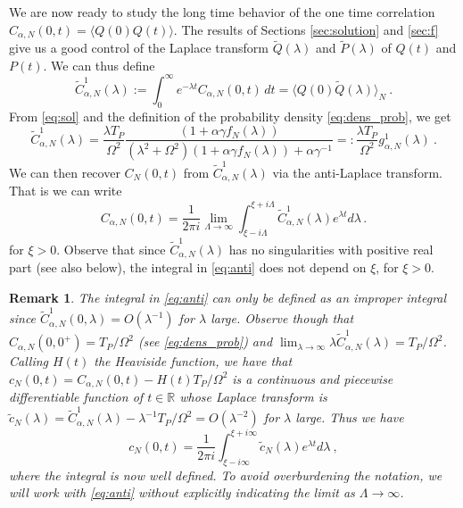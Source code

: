 \documentclass[11pt]{article}
\numberwithin{equation}{section}
\newtheorem{rmk}[theorem]{Remark}
\numberwithin{theorem}{section}
\def\tilde#1{\widetilde{#1}}
\begin{document}
We are now ready to study the long time behavior of the one time correlation $C_{\alpha,N}(0,t)=\langle
Q(0)Q(t)\rangle$. The results of Sections \ref{sec:solution} and \ref{sec:f} give us a good control of the Laplace
transform $\tilde Q(\lambda)$ and $\tilde P(\lambda)$ of $Q(t)$ and $P(t)$. We can thus define
\begin{equation}\label{eq:C1}
\tilde C^1_{\alpha,N}(\lambda) := \int_0^\infty e^{-\lambda t} C_{\alpha,N}(0,t)\,dt =
\langle Q(0)\tilde Q(\lambda)\rangle_N\ .
\end{equation}
From \eqref{eq:sol} and the definition of the probability density \eqref{eq:dens_prob}, we get
\begin{equation}\label{eq:def_g^1_N}
	\tilde C^1_{\alpha,N}(\lambda) = \frac{\lambda T_P}{\Omega^2}\frac{(1+\alpha \gamma
		f_N(\lambda))}{\left(\lambda^2+\Omega^2\right)\left(1+\alpha\gamma
		f_N(\lambda)\right) + \alpha\gamma^{-1}}=:\frac{\lambda T_P}{\Omega^2}
	g^1_{\alpha,N}(\lambda)\ .
\end{equation}
We can then recover $C_N(0,t)$ from $\tilde C^1_{\alpha,N}(\lambda)$ via the anti-Laplace transform. That is we can
write 
\begin{equation}\label{eq:anti}
 C_{\alpha,N}(0,t)=\frac{1}{2\pi
i}\lim_{\Lambda\to\infty}\int_{\xi-i\Lambda}^{\xi+i\Lambda}\tilde
C^1_{\alpha,N}(\lambda)e^{\lambda
t}d\lambda\, .
\end{equation}
for $\xi>0$. Observe that since $\tilde C^1_{\alpha,N}(\lambda)$ has no singularities with positive real part (see also
below), the integral in \eqref{eq:anti} does not depend on $\xi$, for $\xi>0$.

\begin{rmk}\emph {The integral in \eqref{eq:anti} can only be defined as an improper integral since
$\tilde C^1_{\alpha,N}(0,\lambda)=O(\lambda^{-1})$ for $\lambda$ large. Observe though that
$C_{\alpha,N}(0,0^+)=T_P/\Omega^2$ (see \eqref{eq:dens_prob}) and $\lim_{\lambda\to\infty}\lambda \tilde
C^1_{\alpha,N}(\lambda)=T_P/\Omega^2$. Calling $H(t)$ the Heaviside function, we have that
$c_N(0,t)=C_{\alpha,N}(0,t)-H(t)T_P/\Omega^2$ is a continuous and piecewise differentiable function of $t\in\mathds{R}$
whose Laplace transform is $\tilde c_N(\lambda)=\tilde C^1_{\alpha,N}(\lambda)-\lambda^{-1}T_P/\Omega^2=O(\lambda^{-2})$
for $\lambda$ large. Thus we have
\[
 c_N(0,t)=\frac{1}{2\pi
i}\int_{\xi-i\infty}^{\xi+i\infty}\tilde
c_N(\lambda)e^{\lambda
t}d\lambda\ ,
\]
where the integral is now well defined. To avoid overburdening the notation, we will work with \eqref{eq:anti} without
explicitly indicating the limit as $\Lambda\to\infty$.}
\end{rmk}
\end{document}
